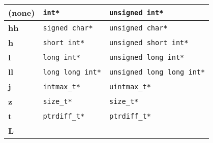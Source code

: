 \begin{center}
\tabletail{\hline}
\tablelasttail{\hline}
\footnotesize
{
\begin{xtabular}[!]{|C{.2\columnwidth}|C{.4\columnwidth}|C{.4\columnwidth}|}
\textbf{(none)}  & \texttt{int*}            & \texttt{unsigned int*}            \\ \hline
\textbf{hh}      & \texttt{signed char*}    & \texttt{unsigned char*}           \\ \hline
\textbf{h}       & \texttt{short int*}      & \texttt{unsigned short int*}      \\ \hline
\textbf{l}       & \texttt{long int*}       & \texttt{unsigned long int*}       \\ \hline
\textbf{ll}      & \texttt{long long int*}  & \texttt{unsigned long long int*}  \\ \hline
\textbf{j}       & \texttt{intmax\_t*}      & \texttt{uintmax\_t*}              \\ \hline
\textbf{z}       & \texttt{size\_t*}        & \texttt{size\_t*}                 \\ \hline
\textbf{t}       & \texttt{ptrdiff\_t*}     & \texttt{ptrdiff\_t*}              \\ \hline
\textbf{L}       &                          &                                   \\ 
\end{xtabular}
}

\vspace{0.2cm}


\end{center}
